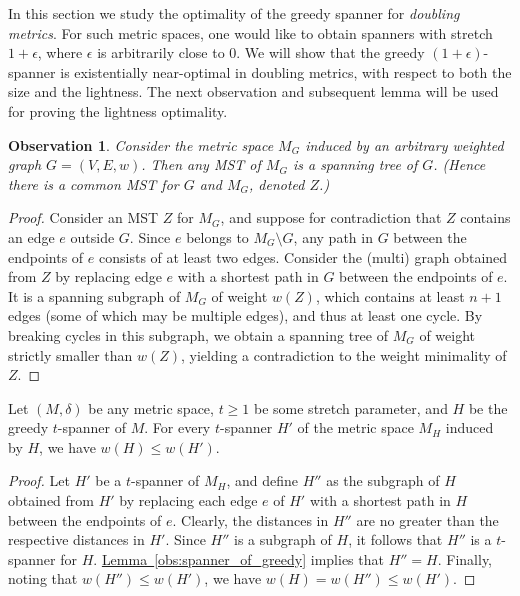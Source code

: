 \documentclass[11pt,letterpaper]{article}
\newtheorem{observation}[lemma]{Observation}
\newcommand{\eps}{\epsilon}
\newcommand{\namedref}[2]{\hyperref[#2]{#1~\ref*{#2}}}
\newcommand{\lemmaref}[1]{\namedref{Lemma}{#1}}
\begin{document}
In this section we study the optimality of the greedy spanner for \emph{doubling metrics}.
For such metric spaces, one would like to obtain spanners with stretch $1+\eps$, where $\eps$ is arbitrarily close to 0.
We will show that the greedy $(1+\eps)$-spanner is existentially near-optimal in doubling metrics, with respect to both the size and the lightness.
The next observation and subsequent lemma will be used for proving the lightness optimality.
\begin{observation} \label{mst-metric}
	Consider the metric space $M_G$ induced by an arbitrary weighted graph $G = (V,E,w)$.
	Then any MST of $M_G$ is a spanning tree of $G$. (Hence there is a common MST for $G$ and $M_G$, denoted $Z$.)
\end{observation}
\begin{proof}
	Consider an MST $Z$ for $M_G$, and suppose for contradiction that $Z$ contains an edge $e$ outside $G$.
	Since $e$ belongs to $M_G \setminus G$, any path in $G$ between the endpoints of $e$ consists of at least two edges.
	Consider the (multi) graph obtained from $Z$ by replacing edge $e$ with a shortest path in $G$ between the endpoints of $e$.
	It is a spanning subgraph of $M_G$ of weight $w(Z)$, which contains at least $n+1$ edges (some of which may be multiple edges), and thus at least one cycle. By breaking cycles in this subgraph,
	we obtain a spanning tree of $M_G$ of weight strictly smaller than $w(Z)$, yielding a contradiction to the weight minimality of $Z$.
\end{proof}


\begin{lemma} \label{lightopt}
	Let $(M,\delta)$ be any metric space, $t \ge 1$ be some stretch parameter, and $H$ be the greedy $t$-spanner of $M$.
	For every $t$-spanner $H'$ of the metric space $M_H$ induced by $H$, we have $w(H) \le w(H')$.
\end{lemma}
\begin{proof}
	Let $H'$ be a $t$-spanner of $M_H$, and define $H''$ as the subgraph of $H$ obtained from $H'$ by replacing each edge $e$ of $H'$ with a shortest path in $H$ between
	the endpoints of $e$.
	Clearly, the distances in $H''$ are no greater than the respective distances in $H'$.
	Since $H''$ is a subgraph of $H$, it follows that $H''$ is a $t$-spanner for $H$.
	\lemmaref{obs:spanner_of_greedy} implies that $H'' = H$.
	Finally, noting that $w(H'') \le w(H')$, we have $w(H) = w(H'') \le w(H')$.
\end{proof}
\end{document}
